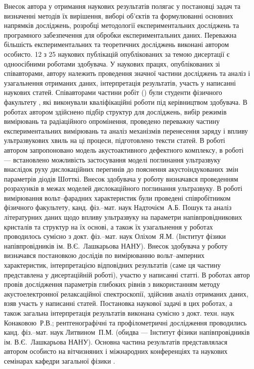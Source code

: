 {\contributionTXT}
Внесок автора у отримання наукових результатів полягає у постановці задач
та визначенні методів їх вирішення, виборі об'єктів та формулюванні
основних напрямків досліджень,
розробці методології експериментальних досліджень та програмного забезпечення для обробки експериментальних даних.
Переважна більшість експериментальних та теоретичних досліджень виконані автором особисто.
12 з 25 наукових публікацій опублікованих за темою дисертації є одноосібними роботами здобувача.
У наукових працях, опублікованих зі співавторами, автору належить проведення значної частини досліджень та аналіз і узагальнення отриманих
даних, інтерпретація результатів, участь у написанні наукових статей.
Співавторами частини робіт (\cite{Olikh2018JAP,Olikh:Ultras2016,Olikh2016JSem,OlikhJAP,Olikh:PZTF2006}) були студенти фізичного факультету \thesisOfOrganization,
які виконували кваліфікаційні роботи під керівництвом здобувача.
В роботах \cite{Olikh2018JAP,Olikh:Ultras2016,Olikh2016JSem,OlikhJAP,Olikh:SEMT2007,Olikh:MRS2007,Olikh:PZTF2006} автором здійснено підбір структур для досліджень, вибір режимів вимірювань та радіаційного опромінення,
проведено переважну частину експериментальних вимірювань та аналіз механізмів перенесення заряду і впливу ультразвукових хвиль на ці процеси,
підготовлено тексти статей.
В роботі \cite{Olikh2018JAP} автором запропоновано модель акустоактивного дефектного комплексу,
в роботі \cite{Olikh:Ultras2016} --- встановлено можливість застосування моделі поглинання ультразвуку внаслідок руху дислокаційних перегинів до пояснення акустоіндукованих змін параметрів діодів Шотткі.
Внесок здобувача у роботу \cite{Olikh:UPJ2014} визначався проведенням розрахунків в межах моделей дислокаційного поглинання ультразвуку.
В роботі \cite{Olikh:UPJ2013} вимірювання вольт--фарадних характеристик були проведені співробітником фізичного факультету, канд. фіз.--мат. наук Надточієм~А.\:Б.
Пошук та аналіз літературних даних щодо впливу ультразвуку на параметри напівпровідникових кристалів та структур на їх основі, а також їх узагальнення
у роботах \cite{Olikh:SEMT2004,Olikh:SEMT2011} проводилось сумісно з
докт. фіз.--мат. наук Оліхом~Я.\:М. (Інститут фізики напівпровідників ім. В.\:Є.~Лашкарьова НАНУ).
Внесок здобувача у роботу \cite{Gorb2010} визначався постановкою дослідів по вимірюванню вольт--амперних характеристик,
інтерпретацією відповідних результатів (саме ця частину представлена у дисертаційній роботі), участю у написанні статті.
В роботах \cite{Olikh:PhChOM2005,Olikh:PJE2004} автор провів дослідження параметрів глибоких рівнів з використанням методу акустоелектронної релаксаційної спектроскопії,
здійснив аналіз отриманих даних, взяв участь у написанні статей.
Постановка наукової задачі в цих роботах, а також загальна інтерпретація результатів виконана сумісно з докт. техн. наук Конаковою~Р.\:В.;
рентгенографічні та профілометричні дослідження проводились канд. фіз.--мат. наук Литвином~П.\:М.  (обидва --- Інститут фізики напівпровідників ім. В.\:Є.~Лашкарьова НАНУ).
Основна частина результатів
представлялася автором особисто на вітчизняних і міжнародних конференціях
та наукових семінарах кафедри загальної фізики \thesisOfOrganization.






